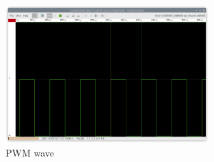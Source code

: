 \documentclass[12pt]{report}
\begin{document}
\begin{figure}[H]
    \centering
    \includegraphics[width=0.7\textwidth]{img/PWM1.png}
    \caption{PWM wave}
    \label{fig:figure1}
\end{figure}\vspace{-2em}
\end{document}

